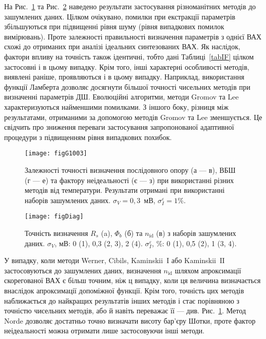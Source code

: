 На Рис.~\ref{figG1003} та Рис.~\ref{figDiag} наведено результати застосування різноманітних методів до зашумлених даних.
Цілком очікувано, помилки при екстракції параметрів збільшуються при підвищенні рівня шуму (рівня випадкових помилок вимірювань).
Проте залежності правильності визначення параметрів з однієї ВАХ схожі до отриманих при аналізі ідеальних синтезованих ВАХ.
Як наслідок, фактори впливу на точність також ідентичні, тобто дані Таблиці~\ref{tabIF} цілком застосовні і в цьому випадку.
Крім того, інші характерні особливості методів, виявлені раніше, проявляються і в цьому випадку.
Наприклад, використання функції Ламберта дозволяє досягнути більшої точності чисельних методів при визначенні параметрів ДШ.
Еволюційні алгоритми, методи Gromov та Lee характеризуються найменшими помилками.
З іншого боку, різниця між результатами, отриманими за допомогою методів Gromov та Lee зменшується.
Це свідчить про зниження переваги застосування запропонованої адаптивної процедури з підвищенням рівня випадкових похибок.



\begin{figure}
\center
\texttt{[image: figG1003]}%
\caption{\label{figG1003}
Залежності точності визначення послідовного опору (а --- в), ВБШ (г --- е) та фактору неідеальності (є --- з) при використанні різних методів від температури.
Результати отримані при використанні наборів зашумлених даних.
$\sigma_V=0,3$~мВ, $\sigma_I^\varepsilon=1\%$.
}
\end{figure}

\begin{figure}
\center
\texttt{[image: figDiag]}%
\caption{\label{figDiag}
Точність визначення $R_s$ (a), $\Phi_b$ (б) та $n_\mathrm{id}$ (в) з наборів зашумлених даних.
$\sigma_V$, мВ: 0 (1), 0,3 (2, 3), 2 (4).
$\sigma_I^\varepsilon$, \%: 0 (1), 0,5 (2), 1 (3, 4).
}
\end{figure}


У випадку, коли методи Werner, Cibils, Kaminskii~I або  Kaminskii~IІ застосовуються до зашумлених даних, визначення $n_\mathrm{id}$ шляхом апроксимації скорегованої ВАХ є більш точним, ніж ц випадку, коли ця величина визначається внаслідок апроксимації допоміжної функції.
Крім того, точність цих методів наближається до найкращих результатів інших методів і стає порівняною з точністю чисельних методів, або й навіть переважає її --- див. Рис.~\ref{figG1003}.
Метод Norde дозволяє достатньо точно визначати висоту бар'єру Шотки, проте фактор неідеальності можна отримати лише застосовуючи інші методи.

